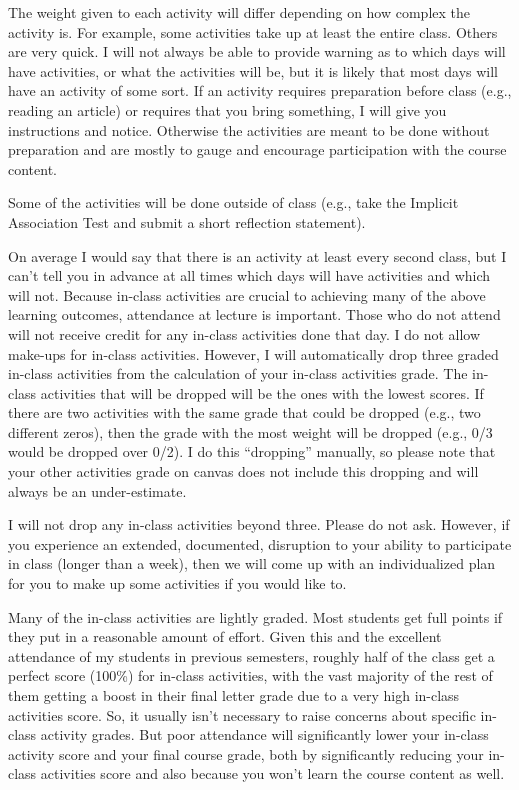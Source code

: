 \documentclass[11pt,letterpaper,final]{article}
\begin{document}
The weight given to each activity will differ depending on how complex the activity is. For example, some activities take up at least the entire class. Others are very quick. I will not always be able to provide warning as to which days will have activities, or what the activities will be, but it is likely that most days will have an activity of some sort. If an activity requires preparation before class (e.g., reading an article) or requires that you bring something, I will give you instructions and notice. Otherwise the activities are meant to be done without preparation and are mostly to gauge and encourage participation with the course content.

Some of the activities will be done outside of class (e.g., take the Implicit Association Test and submit a short reflection statement).

On average I would say that there is an activity at least every second class, but I can't tell you in advance at all times which days will have activities and which will not. Because in-class activities are crucial to achieving many of the above learning outcomes, attendance at lecture is important. Those who do not attend will not receive credit for any in-class activities done that day. I do not allow make-ups for in-class activities. However, I will automatically drop three graded in-class activities from the calculation of your in-class activities grade. The in-class activities that will be dropped will be the ones with the lowest scores. If there are two activities with the same grade that could be dropped (e.g., two different zeros), then the grade with the most weight will be dropped (e.g., 0/3 would be dropped over 0/2). I do this ``dropping'' manually, so please note that your other activities grade on canvas does not include this dropping and will always be an under-estimate.

I will not drop any in-class activities beyond three. Please do not ask. However, if you experience an extended, documented, disruption to your ability to participate in class (longer than a week), then we will come up with an individualized plan for you to make up some activities if you would like to.

Many of the in-class activities are lightly graded. Most students get full points if they put in a reasonable amount of effort. Given this and the excellent attendance of my students in previous semesters, roughly half of the class get a perfect score (100\%) for in-class activities, with the vast majority of the rest of them getting a boost in their final letter grade due to a very high in-class activities score. So, it usually isn't necessary to raise concerns about specific in-class activity grades. But poor attendance will significantly lower your in-class activity score and your final course grade, both by significantly reducing your in-class activities score and also because you won't learn the course content as well.
\end{document}
